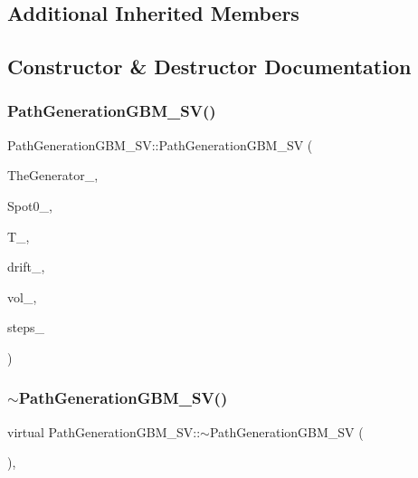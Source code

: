 \subsection*{Additional Inherited Members}


\subsection{Constructor \& Destructor Documentation}
\hypertarget{classPathGenerationGBM__SV_a614c81f73f8313817b2e94cd1746393b}{}\label{classPathGenerationGBM__SV_a614c81f73f8313817b2e94cd1746393b} 
\subsubsection{\texorpdfstring{Path\+Generation\+G\+B\+M\+\_\+\+S\+V()}{PathGenerationGBM\_SV()}}
{\footnotesize\ttfamily Path\+Generation\+G\+B\+M\+\_\+\+S\+V\+::\+Path\+Generation\+G\+B\+M\+\_\+\+SV (\begin{DoxyParamCaption}\item[{shared\+\_\+ptr$<$ \hyperlink{classRandomBase}{Random\+Base} $>$ \&}]{The\+Generator\+\_\+,  }\item[{double}]{Spot0\+\_\+,  }\item[{double}]{T\+\_\+,  }\item[{const \hyperlink{classParameters}{Parameters} \&}]{drift\+\_\+,  }\item[{matrix$<$ double $>$}]{vol\+\_\+,  }\item[{unsigned long}]{steps\+\_\+ }\end{DoxyParamCaption})}

\hypertarget{classPathGenerationGBM__SV_a66138a60ae971e3947c37b05b985c281}{}\label{classPathGenerationGBM__SV_a66138a60ae971e3947c37b05b985c281} 
\subsubsection{\texorpdfstring{$\sim$\+Path\+Generation\+G\+B\+M\+\_\+\+S\+V()}{~PathGenerationGBM\_SV()}}
{\footnotesize\ttfamily virtual Path\+Generation\+G\+B\+M\+\_\+\+S\+V\+::$\sim$\+Path\+Generation\+G\+B\+M\+\_\+\+SV (\begin{DoxyParamCaption}{ }\end{DoxyParamCaption})\hspace{0.3cm}{\ttfamily [inline]}, {\ttfamily [virtual]}}



